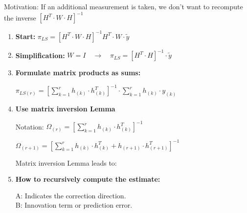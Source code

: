 \documentclass[10pt,a4paper]{scrartcl}
\begin{document}
\begin{multicols*}{3}

Motivation: If an additional measurement is taken, we don't want to recompute the inverse $[H^T\cdot W\cdot H]^{-1}$ 


\begin{enumerate}
\ncompaq
\item \textbf{Start:} $\pi_{LS}=[H^T\cdot W\cdot H]^{-1}H^T\cdot W\cdot \tilde{y}$
\item \textbf{Simplification:} $W=I\quad\rightarrow\quad \pi_{LS}=[H^T\cdot H]^{-1}\cdot\tilde{y}$
\item \textbf{Formulate matrix products as sums:}

$\pi_{LS (r)}=\left[\sum\limits_{k=1}^r h_{(k)} \cdot h^T_{(k)} \right]^{-1} \cdot \sum\limits_{k=1}^r h_{(k)} \cdot y_{(k)}$
\item \textbf{Use matrix inversion Lemma}

Notation: $\Omega_{(r)} = \left[\sum\limits_{k=1}^r h_{(k)} \cdot h^T _{(k)} \right]^{-1}$

$\Omega_{(r+1)} = \left[\sum\limits_{k=1}^r h_{(k)} \cdot h^T_{(k)} + h_{(r+1)} \cdot h^T_{(r+1)} \right]^{-1}$

\dahe Matrix inversion Lemma leads to:

\item \textbf{How to recursively compute the estimate:}




A: Indicates the correction direction. \\
B: Innovation term or prediction error.
\end{enumerate}


\end{multicols*}
\end{document}
